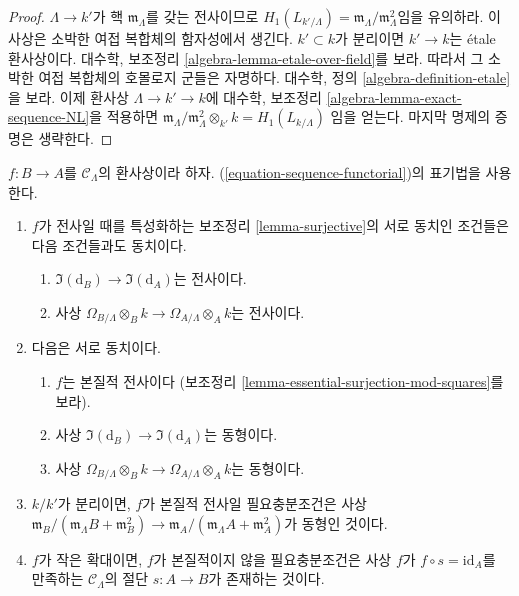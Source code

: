 \begin{proof}
$\Lambda \to k'$가 핵 $\mathfrak m_\Lambda$를 갖는 전사이므로
$H_1(L_{k'/\Lambda}) = \mathfrak m_\Lambda/\mathfrak m_\Lambda^2$임을
유의하라. 이 사상은 소박한 여접 복합체의 함자성에서 생긴다.
$k' \subset k$가 분리이면 $k' \to k$는 \'etale 환사상이다. 대수학,
보조정리 \ref{algebra-lemma-etale-over-field}를 보라.
따라서 그 소박한 여접 복합체의 호몰로지 군들은 자명하다. 대수학, 정의
\ref{algebra-definition-etale}을 보라.
이제 환사상 $\Lambda \to k' \to k$에 대수학, 보조정리
\ref{algebra-lemma-exact-sequence-NL}을 적용하면
$\mathfrak m_\Lambda/\mathfrak m_\Lambda^2 \otimes_{k'} k = H_1(L_{k/\Lambda})$
임을 얻는다. 마지막 명제의 증명은 생략한다.
\end{proof}

\begin{lemma}
\label{lemma-essential-surjection}
$f: B \to A$를 $\mathcal{C}_\Lambda$의 환사상이라 하자.
(\ref{equation-sequence-functorial})의 표기법을 사용한다.
\begin{enumerate}
\item $f$가 전사일 때를 특성화하는 보조정리 \ref{lemma-surjective}의
서로 동치인 조건들은 다음 조건들과도 동치이다.
\begin{enumerate}
\item $\Im(\text{d}_B) \to \Im(\text{d}_A)$는 전사이다.
\item 사상 $\Omega_{B/\Lambda} \otimes_B k \to
\Omega_{A/\Lambda} \otimes_A k$는 전사이다.
\end{enumerate}
\item 다음은 서로 동치이다.
\begin{enumerate}
\item $f$는 본질적 전사이다
(보조정리 \ref{lemma-essential-surjection-mod-squares}를 보라).
\item 사상 $\Im(\text{d}_B) \to \Im(\text{d}_A)$는 동형이다.
\item 사상 $\Omega_{B/\Lambda} \otimes_B k \to
\Omega_{A/\Lambda} \otimes_A k$는 동형이다.
\end{enumerate}
\item $k/k'$가 분리이면, $f$가 본질적 전사일 필요충분조건은 사상
$\mathfrak m_B/(\mathfrak m_\Lambda B + \mathfrak m_B^2) \to
\mathfrak m_A/(\mathfrak m_\Lambda A + \mathfrak m_A^2)$가 동형인 것이다.
\item $f$가 작은 확대이면, $f$가 본질적이지 않을 필요충분조건은 사상
$f$가 $f \circ s = \text{id}_A$를 만족하는 $\mathcal{C}_\Lambda$의 절단
$s: A \to B$가 존재하는 것이다.
\end{enumerate}
\end{lemma}

